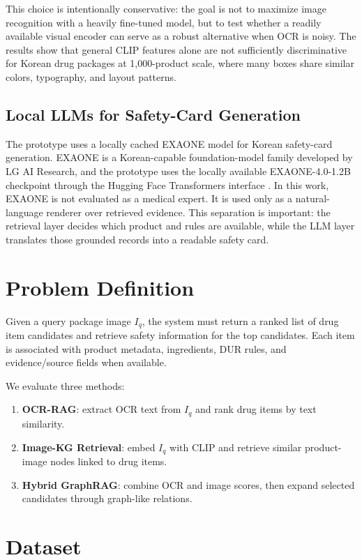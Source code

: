 \documentclass[sigconf,screen,nonacm]{acmart}
\begin{document}
This choice is intentionally conservative: the goal is not to maximize image recognition with a heavily fine-tuned model, but to test whether a readily available visual encoder can serve as a robust alternative when OCR is noisy. The results show that general CLIP features alone are not sufficiently discriminative for Korean drug packages at 1,000-product scale, where many boxes share similar colors, typography, and layout patterns.

\subsection{Local LLMs for Safety-Card Generation}
The prototype uses a locally cached EXAONE model for Korean safety-card generation. EXAONE is a Korean-capable foundation-model family developed by LG AI Research, and the prototype uses the locally available EXAONE-4.0-1.2B checkpoint through the Hugging Face Transformers interface \cite{lgexaone4modelcard}. In this work, EXAONE is not evaluated as a medical expert. It is used only as a natural-language renderer over retrieved evidence. This separation is important: the retrieval layer decides which product and rules are available, while the LLM layer translates those grounded records into a readable safety card.

\section{Problem Definition}
Given a query package image $I_q$, the system must return a ranked list of drug item candidates and retrieve safety information for the top candidates. Each item is associated with product metadata, ingredients, DUR rules, and evidence/source fields when available.

We evaluate three methods:
\begin{enumerate}[leftmargin=*]
    \item \textbf{OCR-RAG}: extract OCR text from $I_q$ and rank drug items by text similarity.
    \item \textbf{Image-KG Retrieval}: embed $I_q$ with CLIP and retrieve similar product-image nodes linked to drug items.
    \item \textbf{Hybrid GraphRAG}: combine OCR and image scores, then expand selected candidates through graph-like relations.
\end{enumerate}

\section{Dataset}
\end{document}
